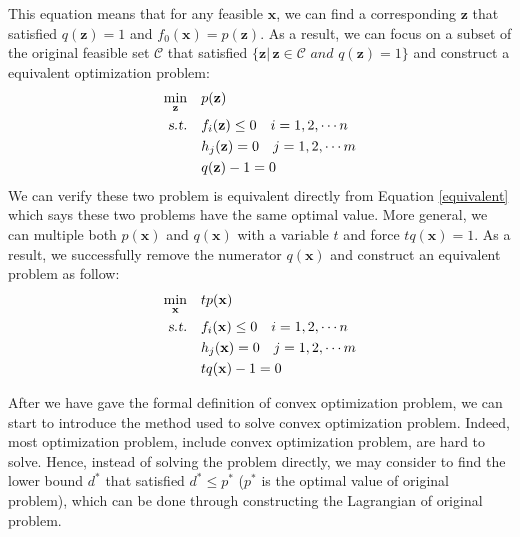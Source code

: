 \documentclass[10pt,a4paper]{article}
\begin{document}
This equation means that for any feasible $\mathbf{x}$, we can find a corresponding $\mathbf{z}$ that satisfied $q(\mathbf{z}) = 1$ and $f_{0}(\mathbf{x}) = p(\mathbf{z})$. As a result, we can focus on a subset of the original feasible set $\mathcal{C}$ that satisfied $\{ \mathbf{z} |\, \mathbf{z} \in \mathcal{C} \textit{ and } q(\mathbf{z}) = 1 \}$ and construct a equivalent optimization problem:
\begin{equation*}
	\begin{aligned}
		\displaystyle\min_{\mathbf{z}} \quad & p(\mathbf{z}) \\
		\textsl{s.t.} \quad & f_{i}(\mathbf{z}) \leq 0 \quad i = 1, 2, \cdots n \\
		& h_{j}(\mathbf{z}) = 0 \quad j = 1, 2, \cdots m \\
		& q(\mathbf{z}) - 1 = 0
	\end{aligned}
\end{equation*}
We can verify these two problem is equivalent directly from Equation \ref{equivalent} which says these two problems have the same optimal value. More general, we can multiple both $p(\mathbf{x})$ and $q(\mathbf{x})$ with a variable $t$ and force $t q(\mathbf{x}) = 1$. As a result, we successfully remove the numerator $q(\mathbf{x})$ and construct an equivalent problem as follow:
\begin{equation*}
	\begin{aligned}
		\displaystyle\min_{\mathbf{x}} \quad & t p(\mathbf{x}) \\
		\textsl{s.t.} \quad & f_{i}(\mathbf{x}) \leq 0 \quad i = 1, 2, \cdots n \\
		& h_{j}(\mathbf{x}) = 0 \quad j = 1, 2, \cdots m \\
		& t q(\mathbf{x}) - 1 = 0
	\end{aligned}
\end{equation*}

After we have gave the formal definition of convex optimization problem, we can start to introduce the method used to solve convex optimization problem. Indeed, most optimization problem, include convex optimization problem, are hard to solve. Hence, instead of solving the problem directly, we may consider to find the lower bound $d^{*}$ that satisfied $d^{*} \leq p^{*}$ ($p^{*}$ is the optimal value of original problem), which can be done through constructing the Lagrangian of original problem.
\end{document}
